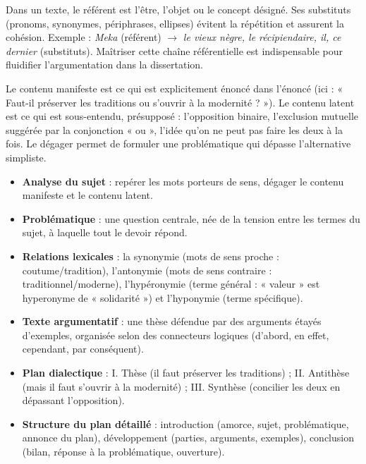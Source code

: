 \documentclass[11pt]{article}
\newcommand{\cle}[1]{{\popxbold\color{popdark}#1}}
\newcounter{popsec}
\newcounter{popsub}
\newcommand{\courssub}[1]{%
  \stepcounter{popsub}%
  \par\vspace{9pt}\noindent{\popxbold\fontsize{11.5}{13}\selectfont\color{popink}{\color{poporange}\thepopsec.\thepopsub}\hspace{6pt}#1}\par\nopagebreak\vspace{4pt}
}
\begin{document}
\courssub{Ressources à mobiliser}

\begin{definition}
Dans un texte, le \cle{référent} est l'être, l'objet ou le concept désigné. Ses \cle{substituts} (pronoms, synonymes, périphrases, ellipses) évitent la répétition et assurent la cohésion. Exemple : \emph{Meka} (référent) $\rightarrow$ \emph{le vieux nègre, le récipiendaire, il, ce dernier} (substituts). Maîtriser cette chaîne référentielle est indispensable pour fluidifier l'argumentation dans la dissertation.
\end{definition}

\begin{definition}
Le \cle{contenu manifeste} est ce qui est explicitement énoncé dans l'énoncé (ici : « Faut-il préserver les traditions ou s'ouvrir à la modernité ? »). Le \cle{contenu latent} est ce qui est sous-entendu, présupposé : l'opposition binaire, l'exclusion mutuelle suggérée par la conjonction « ou », l'idée qu'on ne peut pas faire les deux à la fois. Le dégager permet de formuler une problématique qui dépasse l'alternative simpliste.
\end{definition}

\begin{aretenir}
\begin{itemize}
\item \textbf{Analyse du sujet} : repérer les mots porteurs de sens, dégager le contenu manifeste et le contenu latent.
\item \textbf{Problématique} : une question centrale, née de la tension entre les termes du sujet, à laquelle tout le devoir répond.
\item \textbf{Relations lexicales} : la \cle{synonymie} (mots de sens proche : coutume/tradition), l'\cle{antonymie} (mots de sens contraire : traditionnel/moderne), l'\cle{hypéronymie} (terme général : « valeur » est hyperonyme de « solidarité ») et l'hyponymie (terme spécifique).
\item \textbf{Texte argumentatif} : une thèse défendue par des arguments étayés d'exemples, organisée selon des connecteurs logiques (d'abord, en effet, cependant, par conséquent).
\item \textbf{Plan dialectique} : I. Thèse (il faut préserver les traditions) ; II. Antithèse (mais il faut s'ouvrir à la modernité) ; III. Synthèse (concilier les deux en dépassant l'opposition).
\item \textbf{Structure du plan détaillé} : introduction (amorce, sujet, problématique, annonce du plan), développement (parties, arguments, exemples), conclusion (bilan, réponse à la problématique, ouverture).
\end{itemize}
\end{aretenir}
\end{document}
